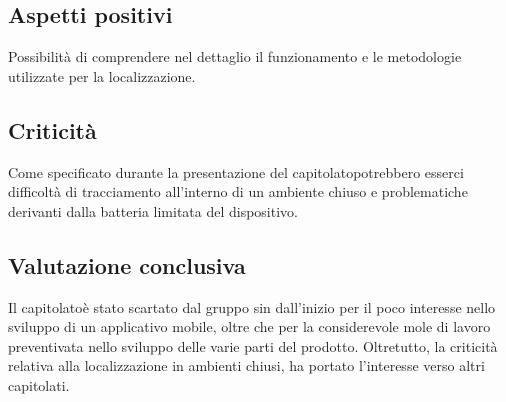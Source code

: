 \subsection{Aspetti positivi}
Possibilità di comprendere nel dettaglio il funzionamento e le metodologie utilizzate per la localizzazione.

\subsection{Criticità}
Come specificato durante la presentazione del capitolato\glo potrebbero esserci difficoltà di tracciamento all'interno di un ambiente chiuso e problematiche derivanti dalla batteria limitata del dispositivo.

\subsection{Valutazione conclusiva}
Il capitolato\glo è stato scartato dal gruppo sin dall'inizio per il poco interesse nello sviluppo di un applicativo mobile, oltre che per la considerevole mole di lavoro preventivata nello sviluppo delle varie parti del prodotto. Oltretutto, la criticità relativa alla localizzazione in ambienti chiusi, ha portato l'interesse verso altri capitolati.
